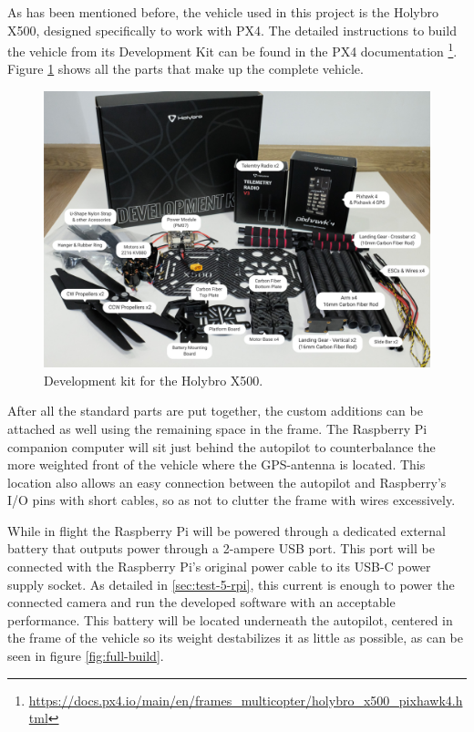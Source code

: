 

As has been mentioned before, the vehicle used in this project is the Holybro X500, designed specifically to work with PX4.
The detailed instructions to build the vehicle from its Development Kit can be found in the PX4 documentation \footnote{\url{https://docs.px4.io/main/en/frames_multicopter/holybro_x500_pixhawk4.html}}.
Figure \ref{fig:x500-dev-kit} shows all the parts that make up the complete vehicle.

\begin{figure}
  \centering
  \includegraphics[width=.6\textwidth, keepaspectratio]{img/x500-dev-kit.jpg}
  \caption{Development kit for the Holybro X500.}
  \label{fig:x500-dev-kit}
\end{figure}


After all the standard parts are put together, the custom additions can be attached as well using the remaining space in the frame.
The Raspberry Pi companion computer will sit just behind the autopilot to counterbalance the more weighted front of the vehicle where the GPS-antenna is located.
This location also allows an easy connection between the autopilot and Raspberry's I/O pins with short cables, so as not to clutter the frame with wires excessively.

While in flight the Raspberry Pi will be powered through a dedicated external battery that outputs power through a 2-ampere USB port.
This port will be connected with the Raspberry Pi's original power cable to its USB-C power supply socket.
As detailed in \ref{sec:test-5-rpi}, this current is enough to power the connected camera and run the developed software with an acceptable performance.
This battery will be located underneath the autopilot, centered in the frame of the vehicle so its weight destabilizes it as little as possible, as can be seen in figure \ref{fig:full-build}.

